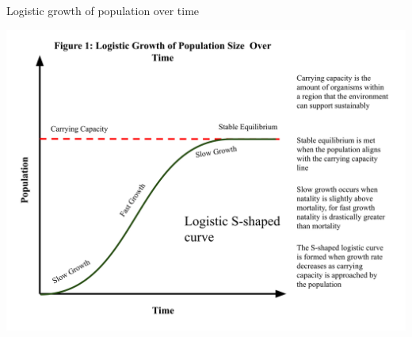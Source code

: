\begin{frame}[t]{Logistic growth of population over time}
\begin{center}
    \includegraphics[scale = 0.11]{lesson_1/images/logistic_model_curve.png}
\end{center}
\end{frame}

